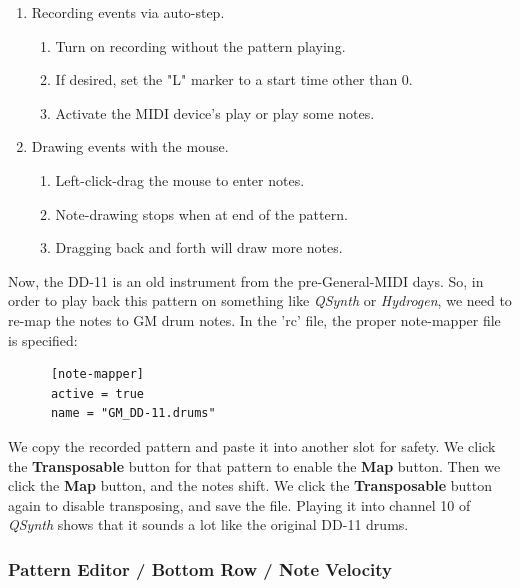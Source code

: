    \begin{enumerate}
      \item Recording events via auto-step.
      \begin{enumerate}
         \item Turn on recording without the pattern playing.
         \item If desired, set the "L" marker to a start time other than 0.
         \item Activate the MIDI device's play or play some notes.
      \end{enumerate}
      \item Drawing events with the mouse.
      \begin{enumerate}
         \item Left-click-drag the mouse to enter notes.
         \item Note-drawing stops when at end of the pattern.
         \item Dragging back and forth will draw more notes.
      \end{enumerate}
   \end{enumerate}

   Now, the DD-11 is an old instrument from the pre-General-MIDI days.
   So, in order to play back this pattern on something like
   \textsl{QSynth} or \textsl{Hydrogen}, we need to re-map the notes to GM drum
   notes.  In the 'rc' file, the proper note-mapper file is specified:

   \begin{verbatim}
      [note-mapper]
      active = true
      name = "GM_DD-11.drums"
   \end{verbatim}

   We copy the recorded pattern and paste it into another slot for safety.
   We click the \textbf{Transposable} button for that pattern to enable the
   \textbf{Map} button.  Then we click the \textbf{Map} button, and the notes
   shift.  
   We click the \textbf{Transposable} button again to disable transposing,
   and save the file.
   Playing it into channel 10 of \textsl{QSynth} shows that it sounds a lot
   like the original DD-11 drums.

\subsubsection{Pattern Editor / Bottom Row / Note Velocity}
\label{subsubsec:pattern_editor_bottom_note_velocity}

   \setcounter{ItemCounter}{0}      %

